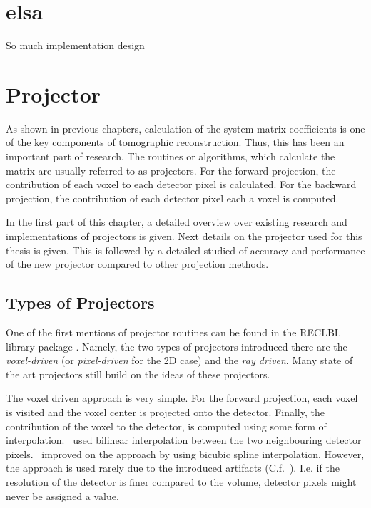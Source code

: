 \chapter{elsa}

So much implementation design

\chapter{Projector}\label{chap:projector}

As shown in previous chapters, calculation of the system matrix coefficients is one of the key
components of tomographic reconstruction. Thus, this has been an important part of research. The
routines or algorithms, which calculate the matrix are usually referred to as projectors. For the
forward projection, the contribution of each voxel to each detector pixel is calculated. For the
backward projection, the contribution of each detector pixel each a voxel is computed.

In the first part of this chapter, a detailed overview over existing research and implementations of
projectors is given. Next details on the projector used for this thesis is given. This is followed
by a detailed studied of accuracy and performance of the new projector compared to other projection
methods.

\section{Types of Projectors}\label{sec:projector_types}

One of the first mentions of projector routines can be found in the RECLBL library package
. Namely, the two types of projectors introduced there are the
\textit{voxel-driven} (or \textit{pixel-driven} for the 2D case) and the \textit{ray driven}. Many
state of the art projectors still build on the ideas of these projectors.

The voxel driven approach is very simple. For the forward projection, each voxel is visited and the
voxel center is projected onto the detector. Finally, the contribution of the voxel to the detector,
is computed using some form of interpolation.~\cite{peters_algorithms_1981} used bilinear
interpolation between the two neighbouring detector pixels.~\cite{harauz_interpolation_1983}
improved on the approach by using bicubic spline interpolation. However, the approach is used rarely
due to the introduced artifacts (C.f.~\cite[Chapter 3.3]{levakhina_three-dimensional_2014}). I.e. if
the resolution of the detector is finer compared to the volume, detector pixels might never be
assigned a value. 

